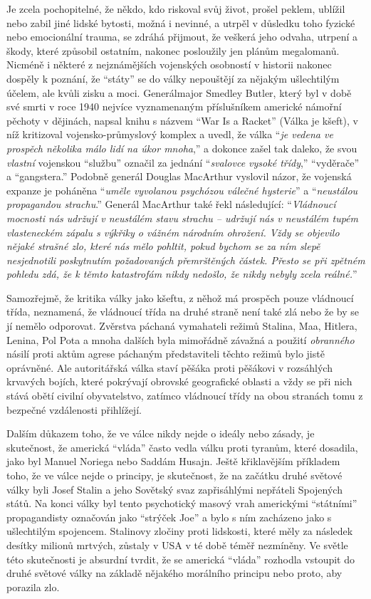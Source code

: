 \documentclass{book}
\begin{document}
Je zcela pochopitelné, že někdo, kdo riskoval svůj život, prošel peklem, ublížil nebo zabil jiné lidské bytosti, možná i nevinné, a utrpěl v důsledku toho fyzické nebo emocionální trauma, se zdráhá přijmout, že veškerá jeho odvaha, utrpení a škody, které způsobil ostatním, nakonec posloužily jen plánům megalomanů. Nicméně i některé z nejznámějších vojenských osobností v historii nakonec dospěly k poznání, že \enquote{státy} se do války nepouštějí za nějakým ušlechtilým účelem, ale kvůli zisku a moci. Generálmajor Smedley Butler, který byl v době své smrti v roce 1940 nejvíce vyznamenaným příslušníkem americké námořní pěchoty v dějinách, napsal knihu s názvem \enquote{War Is a Racket} (Válka je kšeft), v níž kritizoval vojensko-průmyslový komplex a uvedl, že válka \enquote{\emph{je vedena ve prospěch několika málo lidí na úkor mnoha},} a dokonce zašel tak daleko, že svou \emph{vlastní} vojenskou \enquote{službu} označil za jednání \enquote{\emph{svalovce vysoké třídy},} \enquote{vyděrače} a \enquote{gangstera.} Podobně generál Douglas MacArthur vyslovil názor, že vojenská expanze je poháněna \enquote{\emph{uměle vyvolanou psychózou válečné hysterie}} a \enquote{\emph{neustálou propagandou strachu}.} Generál MacArthur také řekl následující: \enquote{\emph{Vládnoucí mocnosti nás udržují v neustálém stavu strachu -- udržují nás v neustálém tupém vlasteneckém zápalu s výkřiky o vážném národním ohrožení. Vždy se objevilo nějaké strašné zlo, které nás mělo pohltit, pokud bychom se za ním slepě nesjednotili poskytnutím požadovaných přemrštěných částek. Přesto se při zpětném pohledu zdá, že k těmto katastrofám nikdy nedošlo, že nikdy nebyly zcela reálné.}}

Samozřejmě, že kritika války jako kšeftu, z něhož má prospěch pouze vládnoucí třída, neznamená, že vládnoucí třída na druhé straně není také zlá nebo že by se jí nemělo odporovat. Zvěrstva páchaná vymahateli režimů Stalina, Maa, Hitlera, Lenina, Pol Pota a mnoha dalších byla mimořádně závažná a použití \emph{obranného} násilí proti aktům agrese páchaným představiteli těchto režimů bylo jistě oprávněné. Ale autoritářská válka staví pěšáka proti pěšákovi v rozsáhlých krvavých bojích, které pokrývají obrovské geografické oblasti a vždy se při nich stává obětí civilní obyvatelstvo, zatímco vládnoucí třídy na obou stranách tomu z bezpečné vzdálenosti přihlížejí.

Dalším důkazem toho, že ve válce nikdy nejde o ideály nebo zásady, je skutečnost, že americká \enquote{vláda} často vedla válku proti tyranům, které dosadila, jako byl Manuel Noriega nebo Saddám Husajn. Ještě křiklavějším příkladem toho, že ve válce nejde o principy, je skutečnost, že na začátku druhé světové války byli Josef Stalin a jeho Sovětský svaz zapřisáhlými nepřáteli Spojených států. Na konci války byl tento psychotický masový vrah americkými \enquote{státními} propagandisty označován jako \enquote{strýček Joe} a bylo s ním zacházeno jako s ušlechtilým spojencem. Stalinovy zločiny proti lidskosti, které měly za následek desítky milionů mrtvých, zůstaly v USA v té době téměř nezmíněny. Ve světle této skutečnosti je absurdní tvrdit, že se americká \enquote{vláda} rozhodla vstoupit do druhé světové války na základě nějakého morálního principu nebo proto, aby porazila zlo.
\end{document}
